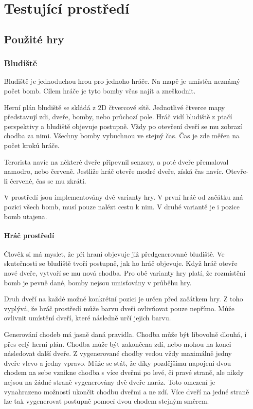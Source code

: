 \chapter{Testující prostředí}

\section{Použité hry}

\subsection{Bludiště}

Bludiště je jednoduchou hrou pro jednoho hráče. Na mapě je umístěn neznámý počet bomb. Cílem hráče je tyto bomby včas najít a zneškodnit.

Herní plán bludiště se skládá z 2D čtvercové sítě. Jednotlivé čtverce mapy představují zdi, dveře, bomby, nebo průchozí pole. Hráč vidí bludiště z ptačí perspektivy a bludiště objevuje postupně. Vždy po otevření dveří se mu zobrazí chodba za nimi. Všechny bomby vybuchnou ve stejný čas. Čas je zde měřen na počet kroků hráče.

Terorista navíc na některé dveře připevnil senzory, a poté dveře přemaloval namodro, nebo červeně. Jestliže hráč otevře modré dveře, získá čas navíc. Otevře-li červené, čas se mu zkrátí.

V prostředí jsou implementovány dvě varianty hry. V první hráč od začátku zná pozici všech bomb, musí pouze nalézt cestu k nim. V druhé variantě je i pozice bomb utajena.

\subsubsection{Hráč prostředí}

Člověk si má myslet, že při hraní objevuje již předgenerované bludiště. Ve skutečnosti se bludiště tvoří postupně, jak ho hráč objevuje. Když hráč otevře nové dveře, vytvoří se mu nová chodba. Pro obě varianty hry platí, že rozmístění bomb je pevně dané, bomby nejsou umisťovány v průběhu hry. 

Druh dveří na každé možné konkrétní pozici je určen před začátkem hry. Z toho vyplývá, že hráč prostředí může barvu dveří ovlivňovat pouze nepřímo. Může ovlivnit umístění dveří, které následně určí jejich barvu.

Generování chodeb má jasně daná pravidla. Chodba může být libovolně dlouhá, i přes celý herní plán. Chodba může být zakončena zdí, nebo mohou na konci následovat další dveře. Z vygenerované chodby vedou vždy maximálně jedny dveře vlevo a jedny vpravo. Může se stát, že díky pozdějšímu napojení dvou chodem na sebe vznikne chodba s více dveřmi po levé, či pravé straně, ale nikdy nejsou na žádné straně vygenerovány dvě dveře naráz. Toto omezení je vynahrazeno možností ukončit chodbu dveřmi a ne zdí. Více dveří na jedné straně lze tak vygenerovat postupně pomocí dvou chodem stejným směrem.

